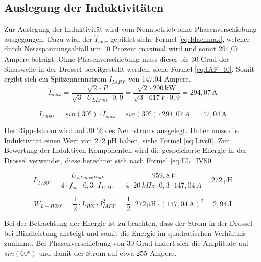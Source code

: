 	\subsection{Auslegung der Induktivitäten}
	Zur Auslegung der Induktivität wird vom Nennbetrieb ohne Phasenverschiebung ausgegangen. Dazu wird der $\hat{I}_{max}$ gebildet siehe Formel \ref{eq:Idachmax}, welcher durch Netzspannungsabfall um 10 Prozent maximal wird und somit 294,07 Ampere beträgt. Ohne Phasenverschiebung muss dieser bis 30 Grad der Sinuswelle in der Drossel bereitgestellt werden, siehe Formel \ref{eq:IAF_I0}. Somit ergibt sich ein Spitzennennstrom $I_{IAF0°}$ von 147,04 Ampere.
	\begin{equation}
		\label{eq:Idachmax}
		\hat{I}_{max} = \dfrac{\sqrt{2} \cdot P   }{ \sqrt{3}  \cdot  U_{LLrms} \cdot 0,9} = \dfrac{\sqrt{2} \cdot 200\, \si{\kilo \watt}} { \sqrt{3} \cdot 617\, \si{V} \cdot 0,9} = 294,07\, \si{\A}
	\end{equation}
	
	\begin{equation}
		\label{eq:IAF_I0}
		I_{IAF0°}= sin(30°)\cdot \hat{I}_{max}=sin(30°)\cdot 294,07 \,A = 147,04\, \si{\A}
	\end{equation}
	
	Der Rippelstrom wird auf 30 \% des Nennstroms ausgelegt. Daher muss die Induktivität einen Wert von 272 \si{\micro \henry} haben, siehe Formel \ref{eq:Livs0}. Zur Bewertung der Induktiven Komponenten wird die gespeicherte Energie in der Drossel verwendet, diese berechnet sich nach Formel \ref{eq:EL_IVS0}
		
		\begin{equation}
			\label{eq:Livs0}
			L_{IVS0°}= \dfrac{U_{LLmaxPeak}}{4\cdot f_{sw} \cdot 0,3 \cdot I_{IAF0°}} = \dfrac{959,8\, V}{4 \cdot 20\, kHz \cdot 0,3 \cdot 147,04\, A}= 272\, \si{\micro \henry}
		\end{equation}
		
		\begin{equation}
			\label{eq:EL_IVS0}
			W_{L-IVS0°}=\dfrac{1}{2} \cdot L_{IVS} \cdot I_{IAF0°}^{2} = \dfrac{1}{2} \cdot 272\, \si{\micro \henry} \cdot (147,04\, \si{\A})^{2} =  2,94 \, \si{\joule}
		\end{equation}
		
		Bei der Betrachtung der Energie ist zu beachten, dass der Strom in der Drossel bei Blindleistung ansteigt und somit die Energie im quadratischen Verhältnis zunimmt. Bei Phasenverschiebung von 30 Grad ändert sich die Amplitude auf $sin(60°)$ und damit der Strom auf etwa 255 Ampere.
			

